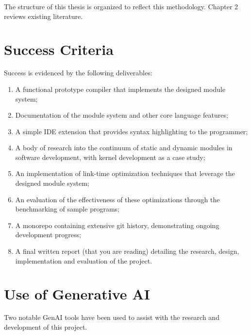 \documentclass[12pt,a4paper,twoside]{report}
\begin{document}
The structure of this thesis is organized to reflect this methodology. Chapter 2 reviews existing literature.

\section{Success Criteria}

Success is evidenced by the following deliverables:

\begin{enumerate}
	\item A functional prototype compiler that implements the designed module system;
	\item Documentation of the module system and other core language features;
	\item A simple IDE extension that provides syntax highlighting to the programmer;
	\item A body of research into the continuum of static and dynamic modules in software development, with kernel development as a case study;
	\item An implementation of link-time optimization techniques that leverage the designed module system;
	\item An evaluation of the effectiveness of these optimizations through the benchmarking of sample programs;
	\item A monorepo containing extensive git history, demonstrating ongoing development progress;
	\item A final written report (that you are reading) detailing the research, design, implementation and evaluation of the project.
\end{enumerate}

\section{Use of Generative AI}

Two notable GenAI tools have been used to assist with the research and development of this project.
\end{document}
